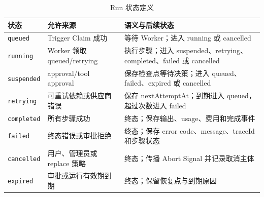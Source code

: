\documentclass[conference,10pt]{IEEEtran}
\newcommand{\code}[1]{\texttt{#1}}
\begin{document}
\begin{table}[htbp]
\caption{Run 状态定义}
\label{tab:appendix-run-status}
\centering
\small
\begin{tabularx}{\textwidth}{p{2.8cm}p{4.2cm}Y}
\toprule
\textbf{状态} & \textbf{允许来源} & \textbf{语义与后续状态} \\
\midrule
\code{queued} & Trigger Claim 成功 & 等待 Worker；进入 running 或 cancelled \\
\code{running} & Worker 领取 queued/retrying & 执行步骤；进入 suspended、retrying、completed、failed 或 cancelled \\
\code{suspended} & approval/tool approval & 保存检查点等待决策；进入 queued、failed、expired 或 cancelled \\
\code{retrying} & 可重试依赖或供应商错误 & 保存 nextAttemptAt；到期进入 queued，超过次数进入 failed \\
\code{completed} & 所有步骤成功 & 终态；保存输出、usage、费用和完成事件 \\
\code{failed} & 终态错误或审批拒绝 & 终态；保存 error code、message、traceId 和步骤状态 \\
\code{cancelled} & 用户、管理员或 replace 策略 & 终态；传播 Abort Signal 并记录取消主体 \\
\code{expired} & 审批或运行有效期到期 & 终态；保留恢复点与到期原因 \\
\bottomrule
\end{tabularx}
\end{table}
\end{document}
